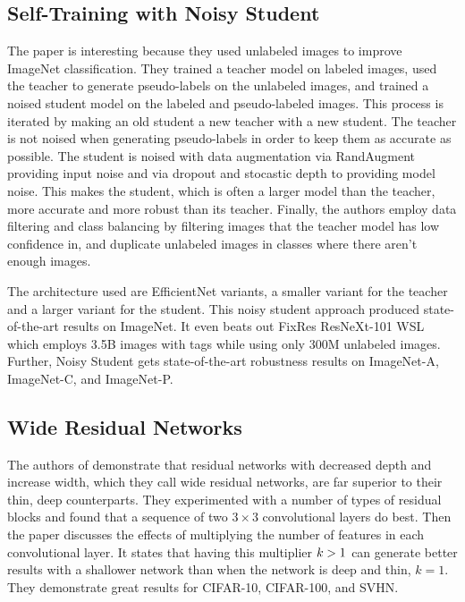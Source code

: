 \documentclass{IEEEtran}
\newcommand{\gt}{\symbol{"3E}}
\begin{document}
\subsection{Self-Training with Noisy Student}
The paper \cite{xie2019selftraining} is interesting because they used unlabeled
images to improve ImageNet classification. They trained a teacher model on
labeled images, used the teacher to generate pseudo-labels on the unlabeled
images, and trained a noised student model on the labeled and pseudo-labeled
images. This process is iterated by making an old student a new teacher with a
new student. The teacher is not noised when generating pseudo-labels in order to
keep them as accurate as possible. The student is noised with data augmentation
via RandAugment \cite{cubuk2019randaugment} providing input noise and via
dropout and stocastic depth to providing model noise. This makes the student,
which is often a larger model than the teacher, more accurate and more robust
than its teacher. Finally, the authors employ data filtering and class balancing
by filtering images that the teacher model has low confidence in, and duplicate
unlabeled images in classes where there aren't enough images.

The architecture used are EfficientNet \cite{tan2019efficientnet} variants, a
smaller variant for the teacher and a larger variant for the student. This noisy
student approach produced state-of-the-art results on ImageNet. It even beats
out FixRes ResNeXt-101 WSL which employs 3.5B images with tags while using only
300M unlabeled images. Further, Noisy Student gets state-of-the-art robustness
results on ImageNet-A, ImageNet-C, and ImageNet-P.

\subsection{Wide Residual Networks}
The authors of \cite{Zagoruyko_2016} demonstrate that residual networks
\cite{He_2016_CVPR} with decreased depth and increase width, which they call
wide residual networks, are far superior to their thin, deep counterparts. They
experimented with a number of types of residual blocks and found that a sequence
of two \(3\times 3\) convolutional layers do best. Then the paper discusses the
effects of multiplying the number of features in each convolutional layer. It
states that having this multiplier \(k\gt 1\) can generate better results with a
shallower network than when the network is deep and thin, \(k = 1\). They
demonstrate great results for CIFAR-10, CIFAR-100, and SVHN.
\end{document}
